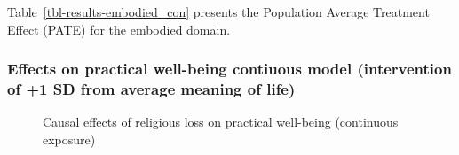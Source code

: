 \documentclass[
  singlecolumn,
  9pt]{scrartcl}
\begin{document}
Table~\ref{tbl-results-embodied_con} presents the Population Average
Treatment Effect (PATE) for the embodied domain.

\subsubsection{Effects on practical well-being contiuous model
(intervention of +1 SD from average meaning of
life)}\label{effects-on-practical-well-being-contiuous-model-intervention-of-1-sd-from-average-meaning-of-life}

\begin{figure}


\caption{\label{fig-results-practical-well-being_con}Causal effects of
religious loss on practical well-being (continuous exposure)}

\end{figure}%
\end{document}
